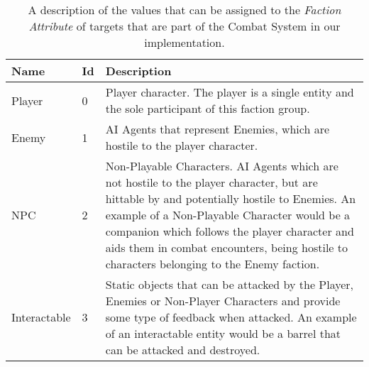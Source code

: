 \begin{table}
    \begin{center}
      \caption{A description of the values that can be assigned to the \emph{Faction Attribute} of targets that are part of the Combat System in our implementation.}
      \label{tab:table-faction-groups}
      \begin{tabular}{ >{\small}w{l}{3em} >{\small}w{c}{3em} m{25em} } %
        \addlinespace
        \toprule
        \bf Name    & \bf Id   & \bf Description                                              \\
        \midrule
        Player       &       0 & Player character. The player is a single entity and the sole 
                                 participant of this faction group.                           \\

        Enemy        &       1 & AI Agents that represent Enemies, which are hostile to the 
                                 player character.                                            \\

        NPC          &       2 & Non-Playable Characters. AI Agents which are not hostile to 
                                 the player character, but are hittable by and potentially 
                                 hostile to Enemies. An example of a Non-Playable Character 
                                 would be a companion which follows the player character and 
                                 aids them in combat encounters, being hostile to characters 
                                 belonging to the Enemy faction.                              \\

        Interactable &       3 & Static objects that can be attacked by the Player, Enemies or 
                                 Non-Player Characters and provide some type of feedback when 
                                 attacked. An example of an interactable entity would be a 
                                 barrel that can be attacked and destroyed.                   \\
        \bottomrule
      \end{tabular}
    \end{center}
\end{table}